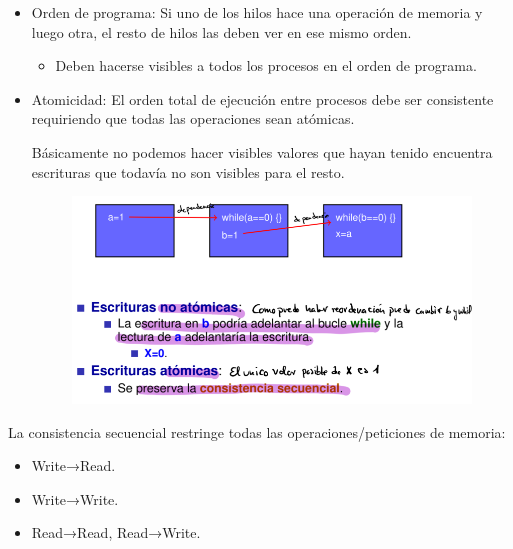 \documentclass[12pt, twoside, openright]{report} %
\begin{document}
    \begin{itemize}
    \item
      Orden de programa: Si uno de los hilos hace una operación de
      memoria y luego otra, el resto de hilos las deben ver en ese
      mismo orden.

      \begin{itemize}
      
      \item
        Deben hacerse visibles a todos los procesos en el orden de
        programa.
      \end{itemize}
    \item
      Atomicidad: El orden total de ejecución entre procesos debe ser
      consistente requiriendo que todas las operaciones sean atómicas.

      Básicamente no podemos hacer visibles valores que hayan tenido
    encuentra escrituras que todavía no son visibles para el resto.

    \begin{figure}[H]
      {\includegraphics[scale=.38]{Untitled 59.png}}
    \end{figure}
    \end{itemize}

    

  
    La consistencia secuencial restringe todas las
    operaciones/peticiones de memoria:

    \begin{itemize}
    
    \item
      Write→Read.
    \item
      Write→Write.
    \item
      Read→Read, Read→Write.
    \end{itemize}
\end{document}
